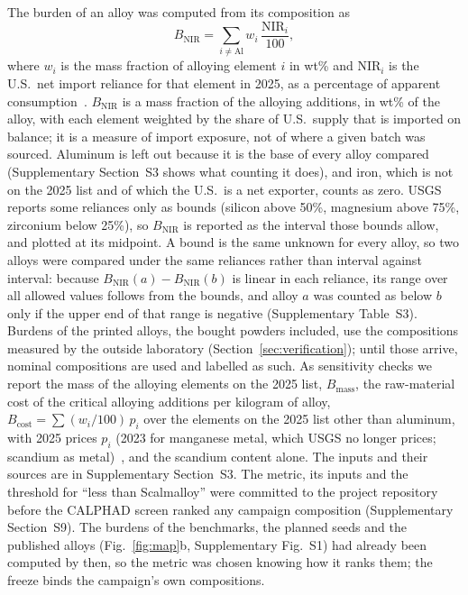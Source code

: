 \documentclass[preprint,12pt]{elsarticle}
\newcommand{\note}[1]{}
\newcommand{\note}[1]{\textcolor{blue!70!black}{\textsf{\footnotesize [Note: #1]}}}
\newcommand{\Scal}{Scalmalloy\xspace}
\begin{document}
The burden of an alloy was computed from its composition as
\begin{equation}
  B_\mathrm{NIR} = \sum_{i \neq \mathrm{Al}} w_i \, \frac{\mathrm{NIR}_i}{100},
  \label{eq:burden}
\end{equation}
where $w_i$ is the mass fraction of alloying element $i$ in wt\% and $\mathrm{NIR}_i$ is the U.S.\ net import reliance for that element in 2025, as a percentage of apparent consumption~\cite{usgs2026}.
$B_\mathrm{NIR}$ is a mass fraction of the alloying additions, in wt\% of the alloy, with each element weighted by the share of U.S.\ supply that is imported on balance; it is a measure of import exposure, not of where a given batch was sourced.
Aluminum is left out because it is the base of every alloy compared (Supplementary Section~S3 shows what counting it does), and iron, which is not on the 2025 list and of which the U.S.\ is a net exporter, counts as zero.
USGS reports some reliances only as bounds (silicon above 50\%, magnesium above 75\%, zirconium below 25\%), so $B_\mathrm{NIR}$ is reported as the interval those bounds allow, and plotted at its midpoint.
A bound is the same unknown for every alloy, so two alloys were compared under the same reliances rather than interval against interval: because $B_\mathrm{NIR}(a)-B_\mathrm{NIR}(b)$ is linear in each reliance, its range over all allowed values follows from the bounds, and alloy $a$ was counted as below $b$ only if the upper end of that range is negative (Supplementary Table~S3).
Burdens of the printed alloys, the bought powders included, use the compositions measured by the outside laboratory (Section~\ref{sec:verification}); until those arrive, nominal compositions are used and labelled as such.
As sensitivity checks we report the mass of the alloying elements on the 2025 list, $B_\mathrm{mass}$, the raw-material cost of the critical alloying additions per kilogram of alloy, $B_\mathrm{cost} = \sum (w_i/100)\,p_i$ over the elements on the 2025 list other than aluminum, with 2025 prices $p_i$ (2023 for manganese metal, which USGS no longer prices; scandium as metal)~\cite{usgs2026}, and the scandium content alone.
The inputs and their sources are in Supplementary Section~S3.
The metric, its inputs and the threshold for ``less than \Scal'' were committed to the project repository before the CALPHAD screen ranked any campaign composition (Supplementary Section~S9). The burdens of the benchmarks, the planned seeds and the published alloys (Fig.~\ref{fig:map}b, Supplementary Fig.~S1) had already been computed by then, so the metric was chosen knowing how it ranks them; the freeze binds the campaign's own compositions.
\note{Recommended (../baselines.md): $B_\mathrm{NIR}$ as primary, compared at the same reliances. It is the only one of the three metrics that both counts how much critical material an alloy carries and separates scandium-free alloys, which a front needs; $B_\mathrm{cost}$ puts every silver-free scandium-free alloy within a dollar per kilogram of the others and some 40 below \Scal. It is also FLAIME's import-reliance node. Sterling to confirm, and to choose the threshold (the robust form, or FLAIME's O4 at $\geq$40\% below \Scal).}
\end{document}
